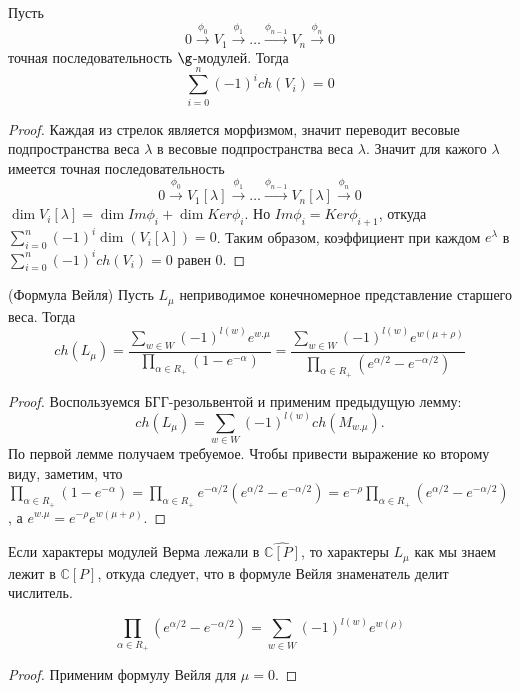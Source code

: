 \documentclass[a4article]{article}
\begin{document}
\begin{lemma}
    Пусть
    \begin{equation}
        0 \xrightarrow{\phi_0}V_1 \xrightarrow{\phi_1}\ldots \xrightarrow{\phi_{n-1}}V_n\xrightarrow{\phi_n}0
    \end{equation}
    точная последовательность $\g$-модулей. Тогда 
    \begin{equation}
        \sum_{i=0}^{n}(-1)^i ch(V_i)=0
    \end{equation}
\end{lemma}
\begin{proof}
    Каждая из стрелок является морфизмом, значит переводит весовые подпространства веса $\lambda$ в весовые подпространства веса $\lambda$. Значит для кажого $\lambda$ имеется точная последовательность 
    \begin{equation}
        0 \xrightarrow{\phi_0}V_1[\lambda] \xrightarrow{\phi_1}\ldots \xrightarrow{\phi_{n-1}}V_n[\lambda]\xrightarrow{\phi_n}0
    \end{equation}
    $\dim V_i[\lambda]=\dim Im\phi_i+\dim Ker\phi_i$. Но $Im\phi_{i}=Ker\phi_{i+1}$, откуда $\sum_{i=0}^{n}(-1)^i \dim(V_i[\lambda])=0$. Таким образом, коэффициент при каждом $e^{\lambda}$ в $\sum_{i=0}^{n}(-1)^i ch(V_i)=0$ равен 0.
\end{proof}
\begin{theorem} (Формула Вейля)
    Пусть $L_{\mu}$ неприводимое конечномерное представление старшего веса. Тогда
    \begin{equation}
        ch(L_{\mu})=\frac{\sum_{w \in W}(-1)^{l(w)}e^{w.\mu}}{\prod_{\alpha \in R_+}(1-e^{-\alpha})}=\frac{\sum_{w \in W}(-1)^{l(w)}e^{w(\mu+\rho)}}{\prod_{\alpha \in R_+}(e^{\alpha/2}-e^{-\alpha/2})}
    \end{equation}
\end{theorem}
\begin{proof}
    Воспользуемся БГГ-резольвентой и применим предыдущую лемму:
    $$ch(L_{\mu})=\sum_{w\in W}(-1)^{l(w)}ch(M_{w.\mu}).$$ По первой лемме получаем требуемое. Чтобы привести выражение ко второму виду, заметим, что $\prod_{\alpha \in R_+}(1-e^{-\alpha})=\prod_{\alpha \in R_+}e^{-\alpha/2}(e^{\alpha/2}-e^{-\alpha/2})=e^{-\rho}\prod_{\alpha \in R_+}(e^{\alpha/2}-e^{-\alpha/2})$, а $e^{w.\mu}=e^{-\rho}e^{w(\mu+\rho)}$.
\end{proof}
\begin{remark}
    Если характеры модулей Верма лежали в $\widehat{\mathbb{C}[P]}$, то характеры $L_{\mu}$ как мы знаем лежит в $\mathbb{C}[P]$, откуда следует, что в формуле Вейля знаменатель делит числитель.
\end{remark}
\begin{corollary}
    \begin{equation}
        \prod_{\alpha \in R_+}(e^{\alpha/2}-e^{-\alpha/2})=\sum_{w\in W}(-1)^{l(w)}e^{w(\rho)}
    \end{equation}
\end{corollary}
\begin{proof}
    Применим формулу Вейля для $\mu = 0$.
\end{proof}
\end{document}

